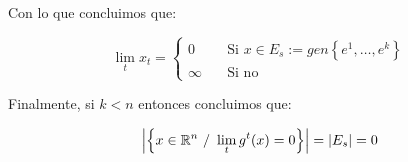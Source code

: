 \begin{example}
	Con lo que concluimos que:
	
	\begin{equation*}
	\lim\limits_t x_t = \left\lbrace{
		\begin{aligned}
		0 & \quad \text{Si } x \in E_s := gen\left\lbrace e^1, \dots, e^k \right\rbrace \\
		\infty & \quad \text{Si no} 
		\end{aligned}
	}\right.
	\end{equation*}
	
	Finalmente, si $k < n$ entonces concluimos que:
	
	\begin{equation*}
	\abs{\sett{x \in \R^n \ / \ \lim\limits_t g^t(x) = 0}} = \abs{E_s} = 0
	\end{equation*}
	
\end{example}

\medskip

